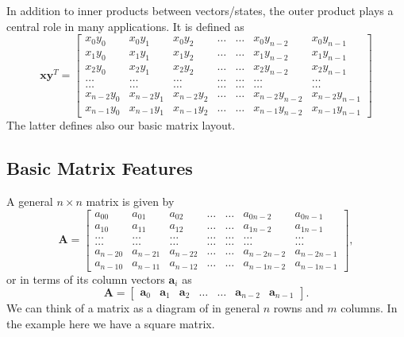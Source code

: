 In addition to inner products between vectors/states, the outer
product plays a central role in many applications. It is
defined as
\[
\bm{x}\bm{y}^T = \begin{bmatrix}
               x_0y_0 & x_0y_1 & x_0y_2 & \dots & \dots & x_0y_{n-2} & x_0y_{n-1} \\
	       x_1y_0 & x_1y_1 & x_1y_2 & \dots & \dots & x_1y_{n-2} & x_1y_{n-1} \\
	       x_2y_0 & x_2y_1 & x_2y_2 & \dots & \dots & x_2y_{n-2} & x_2y_{n-1} \\	       
               \dots &   \dots   & \dots  & \dots & \dots & \dots & \dots \\
               \dots &   \dots   & \dots  & \dots & \dots & \dots & \dots \\	       
	       x_{n-2}y_0 & x_{n-2}y_1 & x_{n-2}y_2 & \dots & \dots & x_{n-2}y_{n-2} & x_{n-2}y_{n-1} \\
	       x_{n-1}y_0 & x_{n-1}y_1 & x_{n-1}y_2 & \dots & \dots & x_{n-1}y_{n-2} & x_{n-1}y_{n-1} \end{bmatrix}	       
\]
The latter defines also our basic matrix layout.

\subsection{Basic Matrix Features}

A general $n\times n$ matrix is given by 
\[
 \bm{A} =
\begin{bmatrix}
               a_{00} & a_{01} & a_{02} & \dots & \dots & a_{0n-2} & a_{0n-1} \\
               a_{10} & a_{11} & a_{12} & \dots & \dots & a_{1n-2} & a_{1n-1} \\
               \dots &   \dots   & \dots  & \dots & \dots & \dots & \dots \\
               \dots &   \dots   & \dots  & \dots & \dots & \dots & \dots \\	       
               a_{n-20} & a_{n-21} & a_{n-22} & \dots & \dots & a_{n-2n-2} & a_{n-2n-1} \\
               a_{n-10} & a_{n-11} & a_{n-12} & \dots & \dots & a_{n-1n-2} & a_{n-1n-1} \end{bmatrix},	       
\]
or in terms of its column vectors $\bm{a}_i$ as
\[
 \bm{A} =
\begin{bmatrix}\bm{a}_{0} & \bm{a}_{1} & \bm{a}_{2} & \dots & \dots & \bm{a}_{n-2} & \bm{a}_{n-1}\end{bmatrix}.	       
\]
We can think of a matrix as a diagram of in general $n$ rowns and $m$ columns. In the example here we have a square matrix.


